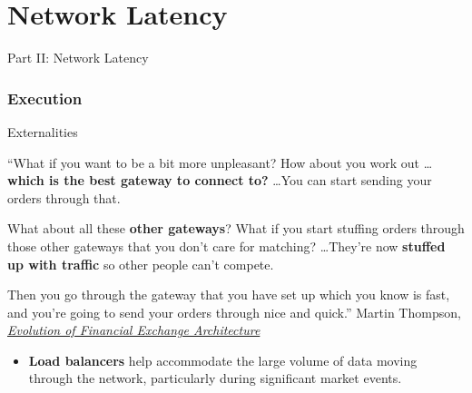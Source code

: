 \documentclass{beamer}
\newif\ifhasdiagram
\newcommand{\sectiondiagram}[1]{%
    \def\insertsdiagram{#1}%
    \hasdiagramtrue
}
\newcommand{\sectionquote}[1]{%
    \def\insertsquote{\small #1}%
}
\newcommand{\insertsdiagram}{}
\newcommand{\insertsquote}{}
\renewcommand{\insertsquote}{}
\renewcommand{\insertsdiagram}{}
\begin{document}
\part{Network Latency}
\begin{frame}{Part II: Network Latency}
	\tableofcontents[part=2]
\end{frame}

\sectiondiagram{execution}
\sectionquote{``We affirm that the world's magnificence has been enriched by a new beauty: \\the beauty of speed.'' Filippo Marinetti}
\section{Execution}

\begin{frame}{Externalities}
	\begin{block}{}
		``What if you want to be a bit more unpleasant? How about you work out \ldots \textbf{which is the best gateway to connect to?} \ldots You can start sending your orders through that.

		What about all these \textbf{other gateways}? What if you start stuffing orders through those other gateways that you don't care for matching? \ldots They're now \textbf{stuffed up with traffic} so other people can't compete.

		Then you go through the gateway that you have set up which you know is fast, and you're going to send your orders through nice and quick.'' Martin Thompson, \href{https://www.infoq.com/presentations/financial-exchange-architecture/}{\textit{Evolution of Financial Exchange Architecture}}
	\end{block}

	\pause

	\begin{itemize}
		\item \textbf{Load balancers} help accommodate the large volume of data moving through the network, particularly during significant market events.
	\end{itemize}

\end{frame}
\end{document}

